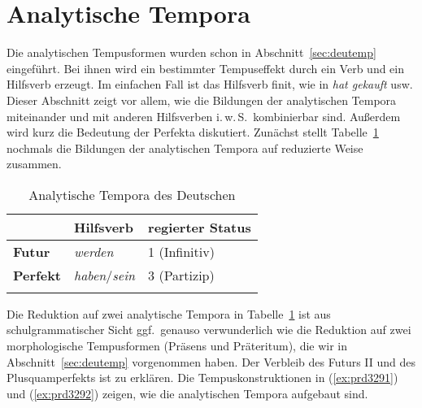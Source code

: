 \begin{exe}
  \ex\label{ex:rel6662}
  \begin{xlist}
  \end{xlist}
\end{exe}

\section{Analytische Tempora}

\label{sec:analytischetempora}

Die analytischen Tempusformen wurden schon in Abschnitt~\ref{sec:deutemp} eingeführt.
Bei ihnen wird ein bestimmter Tempuseffekt durch ein Verb und ein Hilfsverb erzeugt.
Im einfachen Fall ist das Hilfsverb finit, wie in \textit{hat gekauft} usw.
Dieser Abschnitt zeigt vor allem, wie die Bildungen der analytischen Tempora miteinander und mit anderen Hilfsverben i.\,w.\,S.\ kombinierbar sind.
Außerdem wird kurz die Bedeutung der Perfekta diskutiert.
Zunächst stellt Tabelle~\ref{tab:anatemp} nochmals die Bildungen der analytischen Tempora auf reduzierte Weise zusammen.


\begin{table}
  \centering
  \begin{tabular}{lll}
    \lsptoprule
    & \textbf{Hilfsverb} & \textbf{regierter Status} \\
    \midrule
    \textbf{Futur} & \textit{werden} & 1 (Infinitiv) \\
    \textbf{Perfekt} & \textit{haben}\slash\textit{sein} & 3 (Partizip) \\
    \lspbottomrule
  \end{tabular}
  \caption{Analytische Tempora des Deutschen}
  \label{tab:anatemp}
\end{table}

Die Reduktion auf zwei analytische Tempora in Tabelle~\ref{tab:anatemp} ist aus schulgrammatischer Sicht ggf.\ genauso verwunderlich wie die Reduktion auf zwei morphologische Tempusformen (Präsens und Präteritum), die wir in Abschnitt~\ref{sec:deutemp} vorgenommen haben.
Der Verbleib des Futurs II und des Plusquamperfekts ist zu erklären.
Die Tempuskonstruktionen in (\ref{ex:prd3291}) und (\ref{ex:prd3292}) zeigen, wie die analytischen Tempora aufgebaut sind.

